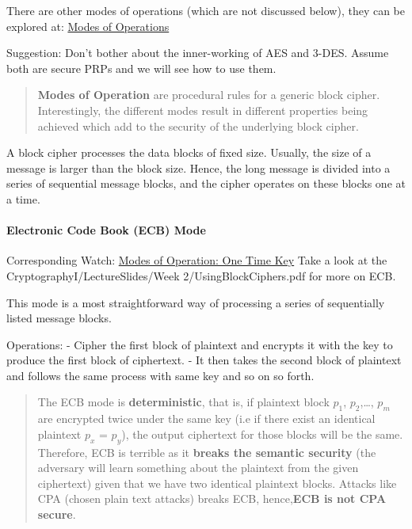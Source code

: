 \documentclass[11pt]{article}
\begin{document}
There are other modes of operations (which are not discussed below),
they can be explored at:
\href{https://www.tutorialspoint.com/cryptography/block_cipher_modes_of_operation.htm}{Modes
of Operations}

Suggestion: Don't bother about the inner-working of AES and 3-DES.
Assume both are secure PRPs and we will see how to use them.

\begin{quote}
\textbf{Modes of Operation} are procedural rules for a generic block
cipher. Interestingly, the different modes result in different
properties being achieved which add to the security of the underlying
block cipher.
\end{quote}

A block cipher processes the data blocks of fixed size. Usually, the
size of a message is larger than the block size. Hence, the long message
is divided into a series of sequential message blocks, and the cipher
operates on these blocks one at a time.

\hypertarget{electronic-code-book-ecb-mode}{%
\paragraph{Electronic Code Book (ECB)
Mode}\label{electronic-code-book-ecb-mode}}

Corresponding Watch:
\href{https://www.coursera.org/learn/crypto/lecture/QZAHs/modes-of-operation-one-time-key}{Modes
of Operation: One Time Key} Take a look at the
CryptographyI/LectureSlides/Week 2/UsingBlockCiphers.pdf for more on
ECB.

This mode is a most straightforward way of processing a series of
sequentially listed message blocks.

Operations: - Cipher the first block of plaintext and encrypts it with
the key to produce the first block of ciphertext. - It then takes the
second block of plaintext and follows the same process with same key and
so on so forth.

\begin{quote}
The ECB mode is \textbf{deterministic}, that is, if plaintext block
\(p_{1}\), \(p_{2}\),\ldots{}, \(p_{m}\) are encrypted twice under the
same key (i.e if there exist an identical plaintext \(p_{x}\) =
\(p_{y}\)), the output ciphertext for those blocks will be the same.
Therefore, ECB is terrible as it \textbf{breaks the semantic security}
(the adversary will learn something about the plaintext from the given
ciphertext) given that we have two identical plaintext blocks. Attacks
like CPA (chosen plain text attacks) breaks ECB, hence,\textbf{ECB is
not CPA secure}.
\end{quote}
\end{document}

